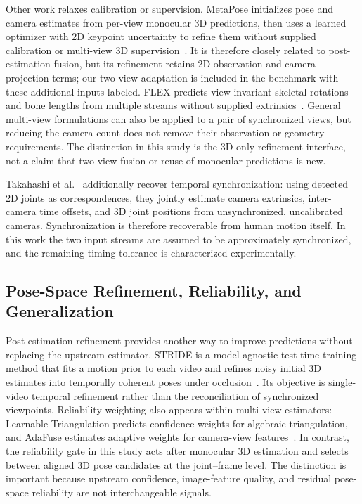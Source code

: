 \documentclass[preprint,12pt]{elsarticle}
\begin{document}
Other work relaxes calibration or supervision. MetaPose initializes pose and camera estimates from per-view monocular 3D predictions, then uses a learned optimizer with 2D keypoint uncertainty to refine them without supplied calibration or multi-view 3D supervision~\cite{usman2022metapose}. It is therefore closely related to post-estimation fusion, but its refinement retains 2D observation and camera-projection terms; our two-view adaptation is included in the benchmark with these additional inputs labeled. FLEX predicts view-invariant skeletal rotations and bone lengths from multiple streams without supplied extrinsics~\cite{gordon2022flex}. General multi-view formulations can also be applied to a pair of synchronized views, but reducing the camera count does not remove their observation or geometry requirements. The distinction in this study is the 3D-only refinement interface, not a claim that two-view fusion or reuse of monocular predictions is new.

Takahashi et al.~\cite{takahashi2018human} additionally recover temporal synchronization: using detected 2D joints as correspondences, they jointly estimate camera extrinsics, inter-camera time offsets, and 3D joint positions from unsynchronized, uncalibrated cameras. Synchronization is therefore recoverable from human motion itself. In this work the two input streams are assumed to be approximately synchronized, and the remaining timing tolerance is characterized experimentally.

\subsection{Pose-Space Refinement, Reliability, and Generalization}
Post-estimation refinement provides another way to improve predictions without replacing the upstream estimator. STRIDE is a model-agnostic test-time training method that fits a motion prior to each video and refines noisy initial 3D estimates into temporally coherent poses under occlusion~\cite{lal2025stride}. Its objective is single-video temporal refinement rather than the reconciliation of synchronized viewpoints. Reliability weighting also appears within multi-view estimators: Learnable Triangulation predicts confidence weights for algebraic triangulation, and AdaFuse estimates adaptive weights for camera-view features~\cite{iskakov2019learnable,zhang2021adafuse}. In contrast, the reliability gate in this study acts after monocular 3D estimation and selects between aligned 3D pose candidates at the joint--frame level. The distinction is important because upstream confidence, image-feature quality, and residual pose-space reliability are not interchangeable signals.
\end{document}
